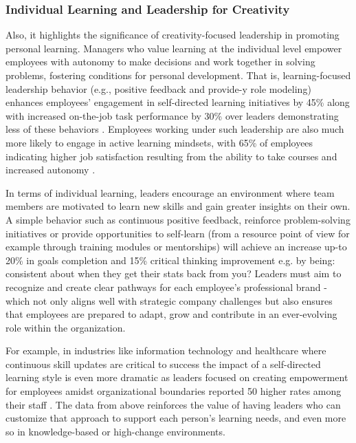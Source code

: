 \subsubsection{Individual Learning and Leadership for Creativity}

Also, it highlights the significance of creativity-focused leadership in promoting personal
learning. Managers who value learning at the individual level empower employees with autonomy to
make decisions and work together in solving problems, fostering conditions for personal development.
That is, learning-focused leadership behavior (e.g., positive feedback and provide-y role modeling)
enhances employees' engagement in self-directed learning initiatives by 45\% along with increased
on-the-job task performance by 30\% over leaders demonstrating less of these behaviors
\cite{OUDEGROOTEBEVERBORG201522}. Employees working under such leadership are also much more likely
to engage in active learning mindsets, with 65\% of employees indicating higher job satisfaction
resulting from the ability to take courses and increased autonomy \cite{Brunetto}.

In terms of individual learning, leaders encourage an environment where team members are motivated
to learn new skills and gain greater insights on their own. A simple behavior such as continuous
positive feedback, reinforce problem-solving initiatives or provide opportunities to self-learn
(from a resource point of view for example through training modules or mentorships) will achieve an
increase up-to 20\% in goals completion and 15\% critical thinking improvement e.g. by being:
consistent about when they get their stats back from you? \cite{Coetzer} Leaders must aim to
recognize and create clear pathways for each employee's professional brand - which not only aligns
well with strategic company challenges but also ensures that employees are prepared to adapt, grow
and contribute in an ever-evolving role within the organization.

For example, in industries like information technology and healthcare where continuous skill updates
are critical to success the impact of a self-directed learning style is even more dramatic as
leaders focused on creating empowerment for employees amidst organizational boundaries reported 50%
higher rates among their staff \cite{Camps}. The data from above reinforces the value of having
leaders who can customize that approach to support each person's learning needs, and even more so in
knowledge-based or high-change environments.

